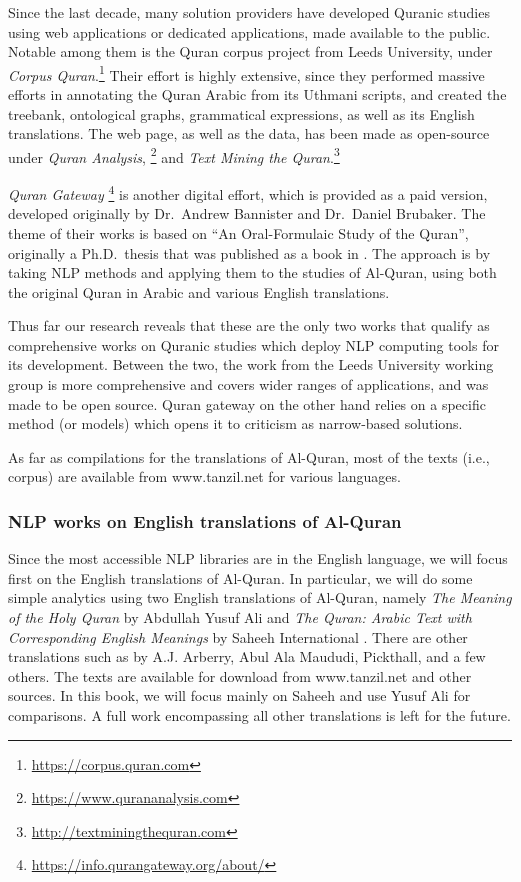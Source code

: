 \documentclass[
]{article}
\begin{document}
Since the last decade, many solution providers have developed Quranic studies using web applications or dedicated applications, made available to the public. Notable among them is the Quran corpus project from Leeds University, under \emph{Corpus Quran}.\footnote{\url{https://corpus.quran.com}} Their effort is highly extensive, since they performed massive efforts in annotating the Quran Arabic from its Uthmani scripts, and created the treebank, ontological graphs, grammatical expressions, as well as its English translations. The web page, as well as the data, has been made as open-source under \emph{Quran Analysis}, \footnote{\url{https://www.qurananalysis.com}} and \emph{Text Mining the Quran}.\footnote{\url{http://textminingthequran.com}}

\emph{Quran Gateway} \footnote{\url{https://info.qurangateway.org/about/}} is another digital effort, which is provided as a paid version, developed originally by Dr.~Andrew Bannister and Dr.~Daniel Brubaker. The theme of their works is based on ``An Oral-Formulaic Study of the Quran'', originally a Ph.D.~thesis that was published as a book in \citep{bannister2014}. The approach is by taking NLP methods and applying them to the studies of Al-Quran, using both the original Quran in Arabic and various English translations.

Thus far our research reveals that these are the only two works that qualify as comprehensive works on Quranic studies which deploy NLP computing tools for its development. Between the two, the work from the Leeds University working group is more comprehensive and covers wider ranges of applications, and was made to be open source. Quran gateway on the other hand relies on a specific method (or models) which opens it to criticism as narrow-based solutions.

As far as compilations for the translations of Al-Quran, most of the texts (i.e., corpus) are available from www.tanzil.net for various languages.

\hypertarget{nlp-works-on-english-translations-of-al-quran}{%
\subsubsection{NLP works on English translations of Al-Quran}\label{nlp-works-on-english-translations-of-al-quran}}

Since the most accessible NLP libraries are in the English language, we will focus first on the English translations of Al-Quran. In particular, we will do some simple analytics using two English translations of Al-Quran, namely \emph{The Meaning of the Holy Quran} by Abdullah Yusuf Ali \citep{yusufali2003} and \emph{The Quran: Arabic Text with Corresponding English Meanings} by Saheeh International \citep{saheeh1997}. There are other translations such as by A.J. Arberry, Abul Ala Maududi, Pickthall, and a few others. The texts are available for download from www.tanzil.net and other sources. In this book, we will focus mainly on Saheeh and use Yusuf Ali for comparisons. A full work encompassing all other translations is left for the future.
\end{document}
